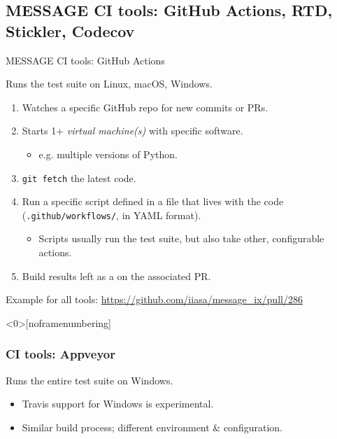 \documentclass[12pt,aspectratio=169]{beamer}
\begin{document}
\subsection{MESSAGE CI tools: GitHub Actions, RTD, Stickler, Codecov}
\begin{frame}{MESSAGE CI tools: GitHub Actions}

{\Large Runs the test suite on Linux, macOS, Windows.}

\bigskip
\begin{enumerate}
  \item Watches a specific GitHub repo for new commits or PRs.
  \item Starts 1+ \emph{virtual machine(s)} with specific software.
    \begin{itemize}
      \item e.g. multiple versions of Python.
    \end{itemize}
  \item \texttt{git fetch} the latest code.
  \item Run a specific script defined in a file that lives with the code
    (\texttt{.github/workflows/}, in YAML format).
    \begin{itemize}
      \item Scripts usually run the test suite, but also take other, configurable actions.
    \end{itemize}
  \item Build results left as a  on the associated PR.
\end{enumerate}

\bigskip
Example for all tools: \url{https://github.com/iiasa/message_ix/pull/286}

\end{frame}

\begin{frame}<0>[noframenumbering]
\frametitle{CI tools: Appveyor}

{\Large Runs the entire test suite on Windows.}

\bigskip
\begin{itemize}
  \item Travis support for Windows is experimental.
  \item Similar build process; different environment \& configuration.
\end{itemize}

\end{frame}
\end{document}
